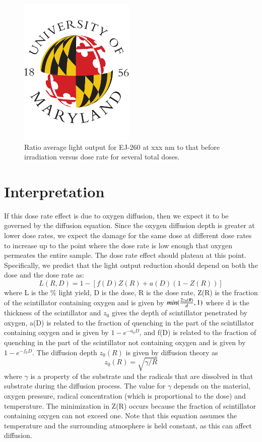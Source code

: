 \documentclass[review]{elsarticle}
\begin{document}
\begin{figure}[!ht]
\begin{center}
\includegraphics[width=0.49\textwidth]{./figures/placeholder.pdf}
\caption{
Ratio average light output for EJ-260 at {\color{red} xxx nm} to that before irradiation versus dose rate for several total doses.
}
\label{fig:fig3}
\end{center}
\end{figure}



\section{Interpretation}


If this dose rate effect is due to oxygen diffusion, then
we expect it to be governed by the diffusion equation.  Since
the oxygen diffusion depth is greater at lower dose rates,
we expect the damage for the same dose at different dose rates to
increase up to the point where the dose rate is low enough that oxygen
permeates the entire sample.  The dose rate effect should plateau
at this point.  Specifically, we predict that the light output
reduction should depend on both the dose and the dose rate as:
$$ L(R,D) = 1 - [f(D)Z(R) + a(D)(1-Z(R))]$$
where L is the \% light yield, D is the dose, R is the dose rate, 
Z(R) is the fraction of the scintillator containing 
oxygen and is given by $min({{2 z_0(R)}\over{d}},1)$
where d is the thickness of the scintillator and $z_0$ gives
the depth of scintillator penetrated by oxygen,
a(D) is related to the fraction of quenching in the part of
the scintillator containing oxygen and is given by $1-e^{-a_0 D}$, 
and
f(D) is related to the fraction of quenching in the part of
the scintillator not containing oxygen and is given by $1-e^{-f_0 D}$.
The diffusion depth $z_0(R)$ is given by diffusion theory as 
$$z_0(R)=\sqrt{\gamma/R}$$
where $\gamma$ is a property of the substrate and the radicals that
are dissolved in that substrate during the diffusion process.
The value for $\gamma$ depends on the material, oxygen pressure,
radical concentration (which is proportional to the dose) and 
temperature.
The minimization in Z(R) occurs because the fraction of scintillator
containing oxygen can not exceed one.  Note that this equation 
assumes the temperature and the surrounding atmosphere
is held constant, as this can 
affect diffusion.
\end{document}
